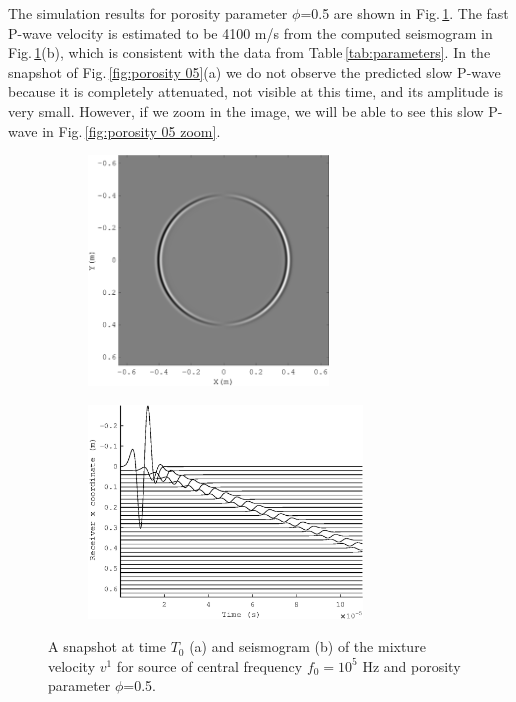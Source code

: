 \documentclass[3p,times,table]{article}
\begin{document}
The simulation results for  porosity parameter $\phi$=0.5 are shown in 
Fig.\,\ref{fig:porosity 05}. The fast P-wave velocity is estimated to be 4100 m/s 
from the
computed seismogram in  Fig.\,\ref{fig:porosity 05}(b), which is consistent with 
the data from Table\,\ref{tab:parameters}. In the snapshot of Fig.\,\ref{fig:porosity 
05}(a) we do not observe the predicted slow P-wave because it is  completely attenuated, 
not visible at this time, and its amplitude is 
very 
small. However, if we 
zoom in the image, we will be able to see this slow P-wave in 
Fig.\,\ref{fig:porosity 05 zoom}.
\begin{figure}[!htbp]
\begin{subfigure}{0.5\linewidth}
\includegraphics[draft=false,width=0.7\textwidth]{Figures/wave_alfa_s_05}
\caption{}
\end{subfigure}
\hfill
\begin{subfigure}{0.5\linewidth}
\includegraphics[draft=false,width=0.8\textwidth]{Figures/alfa_s_05}
\caption{}
\end{subfigure}%
\caption{A snapshot at time $T_{0}$ (a) and seismogram (b) of the mixture 
velocity $v^1$  for source of central frequency $f_{0} =10^{5} $ Hz  and 
porosity 
parameter $\phi$=0.5.}
\label{fig:porosity 05}
\end{figure}
\end{document}
